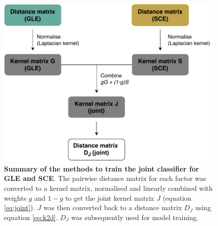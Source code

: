 \begin{figure}[ht!]
    \centering
    \includegraphics[scale=0.8]{graphics/joint_classifier.pdf}
    \caption{\textbf{Summary of the methods to train the joint classifier for GLE and SCE}. The pairwise distance matrix for each factor was converted to a kernel matrix, normalised and linearly combined with weights $g$ and $1-g$ to get the joint kernel matrix $J$ (equation \ref{eq:joint}). $J$ was then converted back to a distance matrix $D_J$ using equation \ref{eq:k2d}. $D_J$ was subsequently used for model training.}
    \label{fig:joint}
\end{figure}
